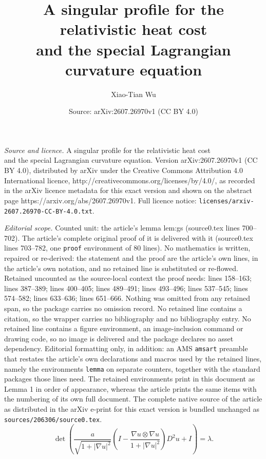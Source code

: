 \documentclass[10pt,a4paper]{amsart}
\title{A singular profile for the relativistic heat cost\\ and the special Lagrangian curvature equation}
\author{Xiao-Tian Wu}
\date{Source: arXiv:2607.26970v1 (CC BY 4.0)}
\newcommand{\D}{\nabla}
\begin{document}
\maketitle

\noindent\emph{Source and licence.} A singular profile for the relativistic heat cost\\ and the special Lagrangian curvature equation. Version arXiv:2607.26970v1 (CC BY 4.0), distributed by arXiv under the Creative Commons Attribution 4.0 International licence, http://creativecommons.org/licenses/by/4.0/, as recorded in the arXiv licence metadata for this exact version and shown on the abstract page https://arxiv.org/abs/2607.26970v1. Full licence notice: \texttt{licenses/arxiv-2607.26970-CC-BY-4.0.txt}.\par\smallskip

\noindent\textit{Editorial scope.} Counted unit: the article's lemma lem:gs (source0.tex lines 700--702). The article's complete original proof of it is delivered with it (source0.tex lines 703--782, one \texttt{proof} environment of 80 lines). No mathematics is written, repaired or re-derived: the statement and the proof are the article's own lines, in the article's own notation, and no retained line is substituted or re-flowed.  Retained uncounted as the source-local context the proof needs: lines 158--163; lines 387--389; lines 400--405; lines 489--491; lines 493--496; lines 537--545; lines 574--582; lines 633--636; lines 651--666.  Nothing was omitted from any retained span, so the package carries no omission record.  No retained line contains a citation, so the wrapper carries no bibliography and no bibliography entry.  No retained line contains a figure environment, an image-inclusion command or drawing code, so no image is delivered and the package declares no asset dependency.  Editorial formatting only, in addition: an AMS \texttt{amsart} preamble that restates the article's own declarations and macros used by the retained lines, namely the environments \texttt{lemma} on separate counters, together with the standard packages those lines need.  The retained environments print in this document as Lemma 1 in order of appearance, whereas the article prints the same items with the numbering of its own full document.  The complete native source of the article as distributed in the arXiv e-print for this exact version is bundled unchanged as \texttt{sources/206306/source0.tex}.
\begin{equation}\label{eq:ot-pde}
  \det\left(
    \frac{a}{\sqrt{1+|\D u|^2}}
    \left(I-\frac{\D u\otimes\D u}{1+|\D u|^2}\right)D^2u+I
  \right)=\lambda.
\end{equation}
\end{document}
